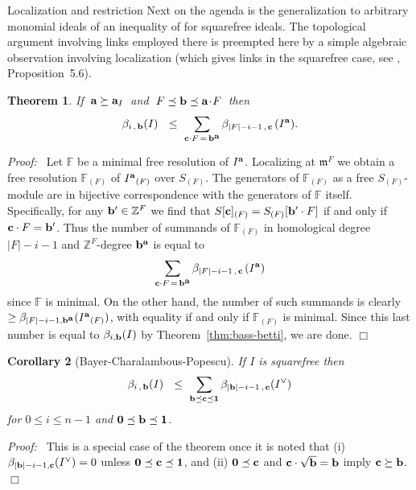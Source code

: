 \documentclass[12pt,leqno]{article}
\newtheorem{thm}{Theorem}[section]
\newtheorem{cor}[thm]{Corollary}
\def\aa{{{\rm \bf a}}}
\def\bb{{{\rm \bf b}}}
\def\cc{{{\rm \bf c}}}
\def\mm{{\mathfrak m}}
\def\FF{{\mathbb F}}
\def\ZZ{{\mathbb Z}}
\begin{document}
\begin{section}{Localization and restriction}
Next on the agenda is the generalization to arbitrary monomial ideals of
an inequality of \cite{BCP} for squarefree ideals.  The topological
argument involving links employed there is preempted here by a simple
algebraic observation involving localization (which gives links in the
squarefree case, see \cite{Hoc}, Proposition~5.6).
\begin{thm} \label{thm:inequalities}
If $\:\aa \succeq \aa_I\:$ and $\:F \preceq \bb \preceq \aa \!\cdot\!
F\:$ then
$$
	\beta_{i\,,\,\bb}(I)\ \ \leq\ \sum_{\cc \cdot F \,=\,
	\bb^{\scriptstyle \aa}} \beta_{|F| - i - 1\,,\,\cc\,}(I^\aa).
$$
\end{thm}
{\it Proof:\ } Let $\FF$ be a minimal free resolution of $I^\aa$.
Localizing at $\mm^F$ we obtain a free resolution $\FF_{(F)}$ of
$I^\aa{}_{(F)}$ over $S_{(F)}$.  The generators of $\FF_{(F)}$ as a free
$S_{(F)}$-module are in bijective correspondence with the generators of
$\FF$ itself.  Specifically, for any $\bb' \in \ZZ^F$ we find that
$S[\cc]_{(F)} = S_{(F)}[\bb' \cdot F]$ if and only if $\cc \cdot F =
\bb'$.  Thus the number of summands of $\FF_{(F)}$ in homological degree
$|F| - i - 1$ and $\ZZ^F$-degree $\bb^\aa$ is equal to
$$
  \sum_{\cc \cdot F \,=\, \bb^{\scriptstyle \aa}} \beta_{|F| - i -
  1\,,\,\cc\,}(I^\aa)
$$
since $\FF$ is minimal.  On the other hand, the number of such summands
is clearly $\geq \beta_{|F| - i - 1,\bb^{\scriptstyle \aa}}
(I^\aa{}_{(F)})$, with equality if and only if $\FF_{(F)}$ is minimal.
Since this last number is equal to $\beta_{i,\bb}(I)$ by
Theorem~\ref{thm:bass-betti}, we are done.
%
\hfill
$\Box$

\begin{cor}[Bayer-Charalambous-Popescu]
If $I$ is squarefree then 
$$
  \beta_{i\,,\,\bb}(I)\ \ \leq\ \sum_{\bb \preceq \cc \preceq {\bf 1}}
  \beta_{|\bb| - i - 1\,,\,\cc}(I^\vee)
$$
for $0 \leq i \leq n-1$ and ${\bf 0} \preceq \bb \preceq {\bf 1}$.
\end{cor}
{\it Proof:\ } This is a special case of the theorem once it is noted
that (i) $\beta_{|\bb| - i - 1, \cc}(I^\vee) = 0$ unless ${\bf 0} \preceq
\cc \preceq {\bf 1}$, and (ii) ${\bf 0} \preceq \cc$ and $\cc \cdot
\sqrt{\bb} = \bb$ imply $\cc \succeq \bb$.
%
\hfill
$\Box$


\end{section}%
\end{document}
